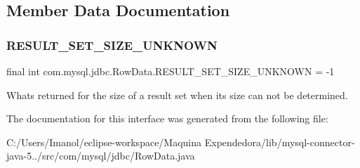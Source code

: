 \subsection{Member Data Documentation}
\mbox{\label{interfacecom_1_1mysql_1_1jdbc_1_1_row_data_a4814df22c9fba39504546b316117c83c}} 
\subsubsection{\texorpdfstring{R\+E\+S\+U\+L\+T\+\_\+\+S\+E\+T\+\_\+\+S\+I\+Z\+E\+\_\+\+U\+N\+K\+N\+O\+WN}{RESULT\_SET\_SIZE\_UNKNOWN}}
{\footnotesize\ttfamily final int com.\+mysql.\+jdbc.\+Row\+Data.\+R\+E\+S\+U\+L\+T\+\_\+\+S\+E\+T\+\_\+\+S\+I\+Z\+E\+\_\+\+U\+N\+K\+N\+O\+WN = -\/1\hspace{0.3cm}{\ttfamily [static]}}

What\textquotesingle{}s returned for the size of a result set when its size can not be determined. 

The documentation for this interface was generated from the following file\+:\begin{DoxyCompactItemize}
\item 
C\+:/\+Users/\+Imanol/eclipse-\/workspace/\+Maquina Expendedora/lib/mysql-\/connector-\/java-\/5../src/com/mysql/jdbc/Row\+Data.\+java\end{DoxyCompactItemize}
